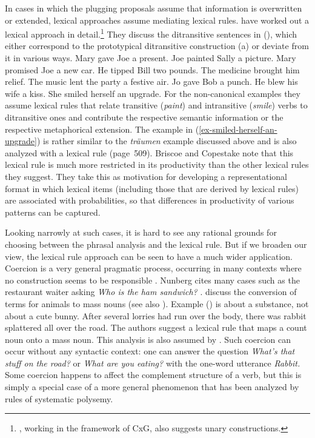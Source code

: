In cases in which the plugging proposals assume that
information is overwritten or extended, lexical approaches assume mediating lexical
rules. \citet[Section~4]{BC99a} have worked out a lexical approach in detail.\footnote{
\citet{Kay2005a}, working in the framework of CxG, also suggests unary constructions.}
They discuss the ditransitive sentences in (), which either correspond to the prototypical
ditransitive construction (a) or deviate from it in various ways.
\eal
\ex Mary gave Joe a present.
\ex\label{paint} Joe painted Sally a picture.
\ex Mary promised Joe a new car.
\ex He tipped Bill two pounds.
\ex The medicine brought him relief.
\ex The music lent the party a festive air.
\ex Jo gave Bob a punch.
\ex He blew his wife a kiss.
\ex\label{ex-smiled-herself-an-upgrade} She smiled herself an upgrade.
\zl
For the non-canonical examples they assume lexical rules that relate transitive (\emph{paint}) and intransitive (\emph{smile}) 
verbs to ditransitive ones and contribute the respective semantic information or the respective
metaphorical extension. The example in (\ref{ex-smiled-herself-an-upgrade}) is rather similar to the
\emph{träumen} example discussed above and is also analyzed with a lexical rule (page~509). Briscoe
and Copestake note that this lexical rule is much more restricted in its productivity than the other lexical
rules they suggest. They take this as motivation for developing a representational
format in which lexical items (including those that are derived by lexical rules) are
associated with probabilities, so that differences in productivity of various patterns can be captured.

Looking narrowly at such cases, it is hard to see any rational grounds for choosing between the phrasal analysis and the lexical rule.  But if we broaden our view, the lexical rule approach can be seen to have a much wider application. 
Coercion is a very general pragmatic process, occurring in many contexts where no construction seems
to be responsible  \citep{Nunberg95a-u}.  Nunberg cites many cases such as the restaurant waiter
asking \emph{Who is the ham sandwich?} \citep[]{Nunberg95a-u}.  
\citet[]{CB92a} discuss the conversion of terms for animals to mass nouns (see also \citet[--43]{CB95a-u}). Example () is about a substance, not about a cute bunny.
\ea
After several lorries had run over the body, there was rabbit splattered all over the road.
\z
The authors suggest a lexical rule that maps a count noun onto a mass noun. This analysis is also
assumed by \citet[--115]{Fillmore99a}.
Such coercion can occur without any syntactic context: one can answer the question \emph{What's that
  stuff on the road?} or \emph{What are you eating?} with the one-word utterance \emph{Rabbit.}
Some coercion happens to affect the complement structure of a verb, but this is simply a special
case of a more general phenomenon that has been analyzed by rules of systematic polysemy.      

